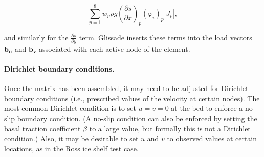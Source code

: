 \begin{equation}
  \label{gliss.eq.sum_over_qp_gravity}
  \sum\limits_{p=1}^{8} { w_p \rho g \left(\frac{\partial s}{\partial x}\right)_p (\varphi_i)_p |J_p|},
\end{equation}

\noindent
and similarly for the $\frac{\partial s}{\partial y}$ term.
Glissade inserts these terms into the load vectors $\mathbf{b_u}$ and $\mathbf{b_v}$
associated with each active node of the element.

\paragraph{Dirichlet boundary conditions.}

Once the matrix has been assembled, it may need to be adjusted for Dirichlet boundary conditions
(i.e., prescribed values of the velocity at certain nodes). The most common Dirichlet condition
is to set $u = v = 0$ at the bed to enforce a no-slip boundary condition.  (A no-slip condition
can also be enforced by setting the basal traction coefficient $\beta$
to a large value, but formally this is not a Dirichlet condition.)  Also, it may be desirable to
set $u$ and $v$ to observed values at certain locations, as in the Ross ice shelf test case.



